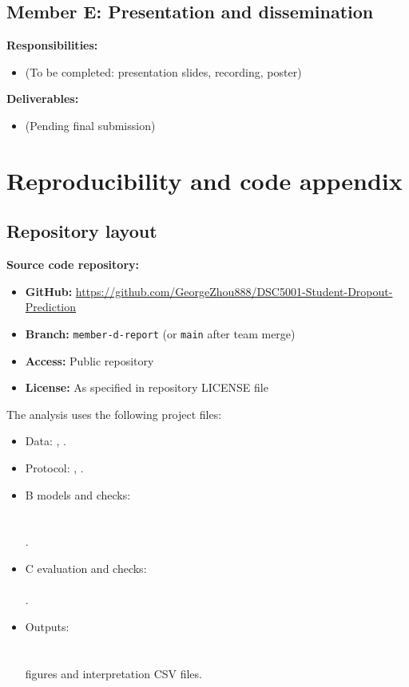 \subsection{Member E: Presentation and dissemination}

\textbf{Responsibilities:}
\begin{itemize}[leftmargin=*]
  \item (To be completed: presentation slides, recording, poster)
\end{itemize}

\textbf{Deliverables:}
\begin{itemize}[leftmargin=*]
  \item (Pending final submission)
\end{itemize}

\section{Reproducibility and code appendix}
\label{app:code}

\subsection{Repository layout}

\textbf{Source code repository:}

\begin{itemize}[leftmargin=*]
  \item \textbf{GitHub:} \url{https://github.com/GeorgeZhou888/DSC5001-Student-Dropout-Prediction}
  \item \textbf{Branch:} \texttt{member-d-report} (or \texttt{main} after team merge)
  \item \textbf{Access:} Public repository
  \item \textbf{License:} As specified in repository LICENSE file
\end{itemize}

The analysis uses the following project files:
\begin{itemize}[leftmargin=*]
  \item Data: , .
  \item Protocol: , .
  \item B models and checks:\\
  \\
  \\
  .
  \item C evaluation and checks:\\
  \\
  .
  \item Outputs:\\
  \\
  \\
  figures and interpretation CSV files.
\end{itemize}

